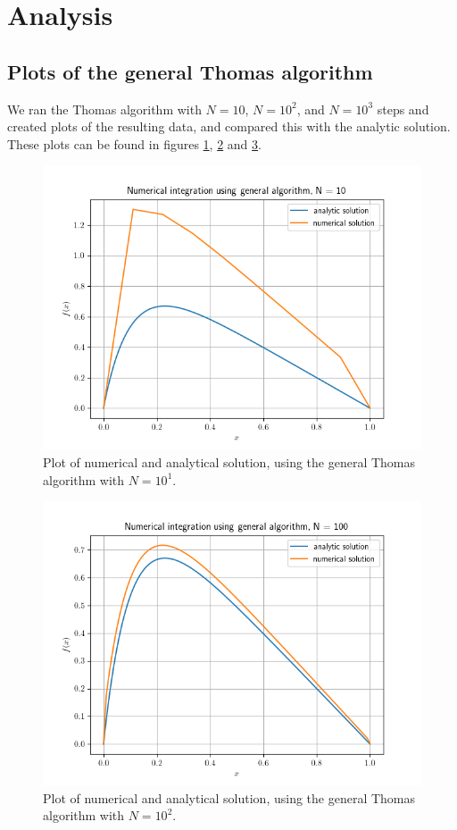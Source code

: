 \documentclass[english,notitlepage,reprint,nofootinbib]{revtex4-1}  %
\begin{document}
\newpage

\section{Analysis} \label{sec:IV}
\subsection{Plots of the general Thomas algorithm} \label{subsec:IV:A}

We ran the Thomas algorithm with $N=10$, $N=10^2$, and $N=10^3$ steps and created plots of the resulting data, and compared this with the analytic solution. These plots can be found in figures \hyperref[fig:iv:a:1]{1}, \hyperref[fig:iv:a:2]{2} and \hyperref[fig:iv:a:3]{3}.


\begin{figure}[H]
	\centering
	\label{fig:iv:a:1}
	\includegraphics[width=\columnwidth]{plots/Figure_1.png}
	\caption{Plot of numerical and analytical solution, using the general Thomas algorithm with
	\(N=10^{1}\).}
\end{figure}

\begin{figure}[H]
	\centering
	\label{fig:iv:a:2}
	\includegraphics[width=\columnwidth]{plots/Figure_2.png}
	\caption{Plot of numerical and analytical solution, using the general Thomas algorithm with
	\(N=10^{2}\).}
\end{figure}
\end{document}
